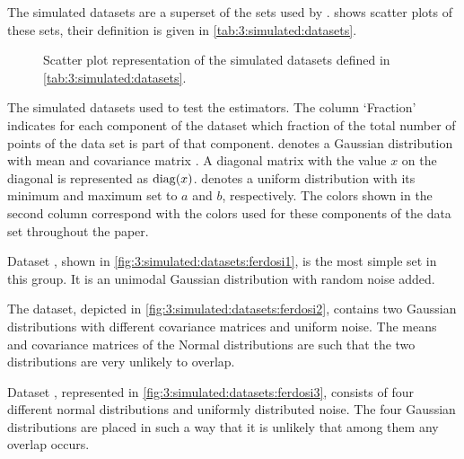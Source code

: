 
The simulated datasets are a superset of the sets used by \textcite{ferdosi2011comparison}.  shows scatter plots of these sets, their definition is given in \cref{tab:3:simulated:datasets}.

\begin{figure*}
	\centering
				
	\caption{Scatter plot representation of the simulated datasets defined in \cref{tab:3:simulated:datasets}. }
	\label{fig:3:simulated:datasets}
\end{figure*}

\begin{table*}
	\centering
	
	\caption{The simulated datasets used to test the estimators. The column `Fraction' indicates for each component of the dataset which fraction of the total number of points of the data set is part of that component. \gaussDist{\varMean}{\varCovarianceMatrix} denotes a Gaussian distribution with mean \varMean and covariance matrix \varCovarianceMatrix. A diagonal matrix with the value $x$ on the diagonal is represented as $\operatorname{diag}(x)$.  denotes a uniform distribution with its minimum and maximum set to $a$ and $b$, respectively. The colors shown in the second column correspond with the colors used for these components of the data set throughout the paper.} 	
	\label{tab:3:simulated:datasets}
\end{table*}

	Dataset \ferdosiOne, shown in \cref{fig:3:simulated:datasets:ferdosi1}, is the most simple set in this group. It is an unimodal Gaussian distribution with random noise added. 

	The \ordinalstringnum{\ferdosiTwoNum} dataset, depicted in \cref{fig:3:simulated:datasets:ferdosi2}, contains two Gaussian distributions with different covariance matrices and uniform noise. The means and covariance matrices of the Normal distributions are such that the two distributions are very unlikely to overlap. 

	Dataset \ferdosiThree, represented in \cref{fig:3:simulated:datasets:ferdosi3}, consists of four different normal distributions and uniformly distributed noise. The four Gaussian distributions are placed in such a way that it is unlikely that among them any overlap occurs.

